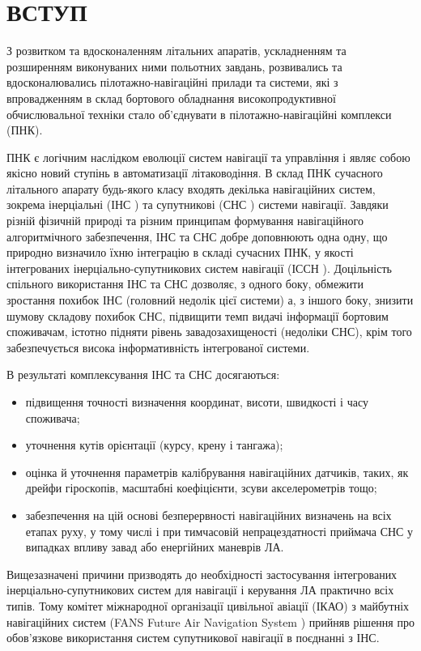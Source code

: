 \section*{ВСТУП}

З розвитком та вдосконаленням літальних апаратів, ускладненням та розширенням 
виконуваних ними польотних завдань, розвивались та вдосконалювались пілотажно-навігаційні 
прилади та системи, які з впровадженням в склад бортового обладнання високопродуктивної 
обчислювальної техніки стало об'єднувати в пілотажно-навігаційні комплекси (ПНК).

ПНК є логічним наслідком еволюції систем навігації та управління і являє собою якісно 
новий ступінь в автоматизації літаководіння. В склад ПНК сучасного літального апарату 
будь-якого класу входять декілька навігаційних систем, зокрема інерціальні 
(ІНС ) та супутникові 
(СНС ) системи навігації. Завдяки різній фізичній природі 
та різним принципам формування навігаційного алгоритмічного забезпечення,  ІНС 
та СНС добре доповнюють одна одну, що природно визначило їхню інтеграцію в 
складі сучасних ПНК, у якості  інтегрованих інерціально-супутникових систем 
навігації (ІССН ). Доцільність спільного використання ІНС та СНС дозволяє, з 
одного боку, обмежити зростання похибок ІНС (головний недолік цієї системи) а, 
з іншого боку, знизити шумову складову похибок СНС, підвищити темп видачі 
інформації бортовим споживачам, істотно підняти рівень завадозахищеності (недоліки СНС), 
крім того забезпечується висока інформативність інтегрованої системи. 

В результаті комплексування ІНС та СНС досягаються:
\begin{itemize}
 \item підвищення точності визначення координат, висоти, швидкості і часу споживача;
 \item уточнення кутів орієнтації (курсу, крену і тангажа); 
 \item оцінка й уточнення параметрів калібрування навігаційних датчиків, таких, як 
дрейфи гіроскопів, масштабні коефіцієнти, зсуви акселерометрів тощо;
 \item забезпечення на цій основі безперервності навігаційних визначень на 
всіх етапах руху, у тому числі і при тимчасовій непрацездатності приймача СНС у 
випадках впливу  завад або енергійних маневрів ЛА.
\end{itemize}
Вищезазначені причини призводять до необхідності застосування інтегрованих 
інерціально-супутникових систем для навігації і керування ЛА практично всіх типів. 
Тому комітет міжнародної організації цивільної авіації (ІКАО) з майбутніх навігаційних 
систем (FANS Future Air Navigation System ) 
прийняв рішення про обов'язкове використання систем супутникової навігації в поєднанні з ІНС.

